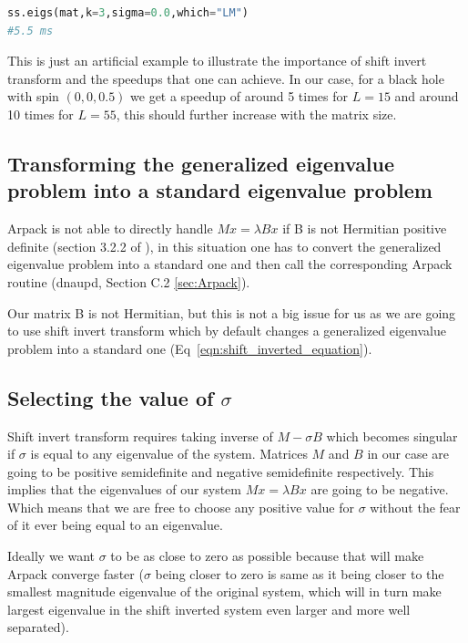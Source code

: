 \documentclass[%
 reprint,
 amsmath,amssymb,
 aps,
]{revtex4-2}
\begin{document}
\begin{lstlisting}[language=Python, caption=Using shift invert transform to speedup finding the smallest eigenvalues]
ss.eigs(mat,k=3,sigma=0.0,which="LM")
#5.5 ms
\end{lstlisting}

This is just an artificial example to illustrate the importance of shift invert transform and the speedups that one can achieve. In our case, for a black hole with spin $(0,0,0.5)$ we get a speedup of around 5 times for $L = 15$ and around 10 times for $L=55$, this should further increase with the matrix size. 


\subsection{Transforming the generalized eigenvalue problem into a standard eigenvalue problem}

Arpack is not able to directly handle $M x = \lambda B x$ if B is not Hermitian positive definite (section 3.2.2 of \cite{arpack_guide}), in this situation one has to convert the generalized eigenvalue problem into a standard one and then call the corresponding Arpack routine (dnaupd, Section C.2 \ref{sec:Arpack}).

Our matrix B is not Hermitian, but this is not a big issue for us as we are going to use shift invert transform which by default changes a generalized eigenvalue problem into a standard one (Eq~\ref{eqn:shift_inverted_equation}).

\subsection{Selecting the value of $\sigma$}

Shift invert transform requires taking inverse of $M -\sigma B$ which becomes singular if $\sigma$ is equal to any eigenvalue of the system.
Matrices $M$ and $B$ in our case are going to be positive semidefinite and negative semidefinite respectively. This implies that the eigenvalues of our system $M x = \lambda B x$ are going to be negative. Which means that we are free to choose any positive value for $\sigma$ without the fear of it ever being equal to an eigenvalue.

Ideally we want $\sigma$ to be as close to zero as possible because that will make Arpack converge faster ($\sigma$ being closer to zero is same as it being closer to the smallest magnitude eigenvalue of the original system, which will in turn make largest eigenvalue in the shift inverted system even larger and more well separated).
\end{document}
